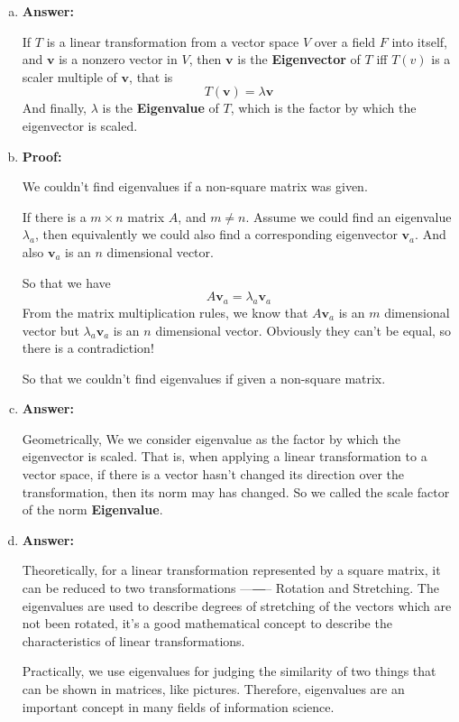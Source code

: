 \documentclass[10.5pt]{article}
\newcommand\minanswer{\vspace{.2in}\textbf{Answer:}\vspace{.4em}\par}
\newcommand\minproof{\vspace{.3in}\textbf{Proof:}\vspace{.4em}\par}
\begin{document}
	\begin{enumerate}[(a)]
		\item \minanswer{}If $T$ is a linear transformation from a vector space $V$ over a field $F$ into itself, and $\mathbf{v}$ is a nonzero vector in $V$, then $\mathbf{v}$ is the \textbf{Eigenvector}
		of $T$ iff $T(v)$ is a scaler multiple of $\mathbf{v}$, that is $$T(\mathbf{v}) = \lambda \mathbf{v}$$ And finally, $\lambda$ is the \textbf{Eigenvalue} of $T$, which is the factor by 
		which the eigenvector is scaled.

		\item \minproof{}We couldn't find eigenvalues if a non-square matrix was given.
		
		If there is a $m\times n$ matrix $A$, and $m\neq n$.
		Assume we could find an eigenvalue $\lambda_a$, then equivalently we could also find a corresponding eigenvector $\mathbf{v}_a$. And also $\mathbf{v}_a$ is an $n$ dimensional vector.

		So that we have $$A\mathbf{v}_a = \lambda_a \mathbf{v}_a$$
		From the matrix multiplication rules, we know that $A\mathbf{v}_a$ is an $m$ dimensional vector but $\lambda_a \mathbf{v}_a$ is an $n$ dimensional vector. Obviously they can't be equal, so there is a contradiction!
		
		So that we couldn't find eigenvalues if given a non-square matrix.

		\item\minanswer{} Geometrically, We we consider eigenvalue as the factor by which the eigenvector is scaled.
		That is, when applying a linear transformation to a vector space, if there is a vector hasn't changed its direction over the transformation, then
		its norm may has changed. So we called the scale factor of the norm \textbf{Eigenvalue}.

		\item\minanswer{} Theoretically, for a linear transformation represented by a square matrix, it can be reduced to two transformations —―– Rotation and Stretching. The eigenvalues are used to describe degrees of stretching of the vectors
		which are not been rotated, it's a good mathematical concept to describe the characteristics of linear transformations.

		Practically, we use eigenvalues for judging the similarity of two things that can be shown in matrices, like pictures. Therefore, eigenvalues are an important concept in many fields of information science.
	\end{enumerate}
\pagebreak
\end{document}
